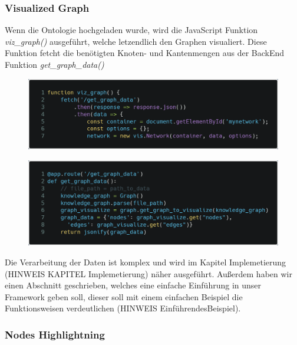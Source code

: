\subsubsection*{Visualized Graph}

Wenn die Ontologie hochgeladen wurde, wird die JavaScript Funktion \textit{viz\_graph()} ausgeführt, welche letzendlich den Graphen visualiert.
Diese Funktion fetcht die benötigten Knoten- und Kantenmengen aus der BackEnd Funktion \textit{get\_graph\_data()}

\begin{figure}[!ht]
    \includegraphics[scale=0.2]{Graphics/viz_graph_function().png}
\end{figure}

\begin{figure}[!ht]
    \includegraphics[scale=0.2]{Graphics/get_graph_data.png}
\end{figure}

Die Verarbeitung der Daten ist komplex und wird im Kapitel Implemetierung (HINWEIS KAPITEL Implemetierung) näher ausgeführt.
Außerdem haben wir einen Abschnitt geschrieben, welches eine einfache Einführung in unser Framework geben soll, dieser soll mit einem einfachen Beispiel die Funktionsweisen verdeutlichen (HINWEIS EinführendesBeispiel).

\subsubsection*{Nodes Highlightning}


